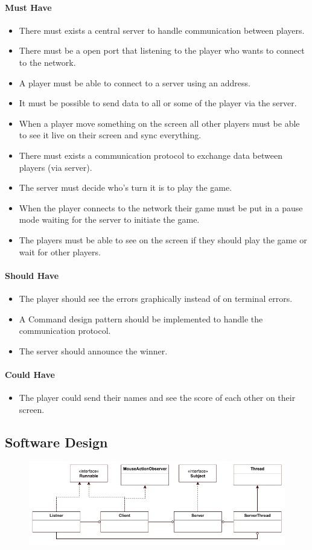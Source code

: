 \documentclass{article}
\begin{document}
\paragraph{Must Have}
\begin{itemize}
	\item There must exists a central server to handle communication between players.
	\item There must be a open port that listening to the player who wants to connect to the network.
	\item A player must be able to connect to a server using an address.
	\item It must be possible to send data to all or some of the player via the server.
	\item When a player move something on the screen all other players must be able to see it live on their screen and sync everything.
	\item There must exists a communication protocol to exchange data between players (via server).
	\item The server must decide who's turn it is to play the game.
	\item When the player connects to the network their game must be put in a pause mode waiting for the server to initiate the game.
	\item The players must be able to see on the screen if they should play the game or wait for other players.
\end{itemize}

\paragraph{Should Have}
\begin{itemize}
	\item The player should see the errors graphically instead of on terminal errors.
	\item A Command design pattern should be implemented to handle the communication protocol.
	\item The server should announce the winner.
\end{itemize}
\paragraph{Could Have}
\begin{itemize}
	\item The player could send their names and see the score of each other on their screen.
\end{itemize}
 

\subsection{Software Design}
\begin{figure}[H]
\includegraphics[scale=0.55]{Images/MultiplayerClassDiagram.jpeg}
\end{figure}
\end{document}
